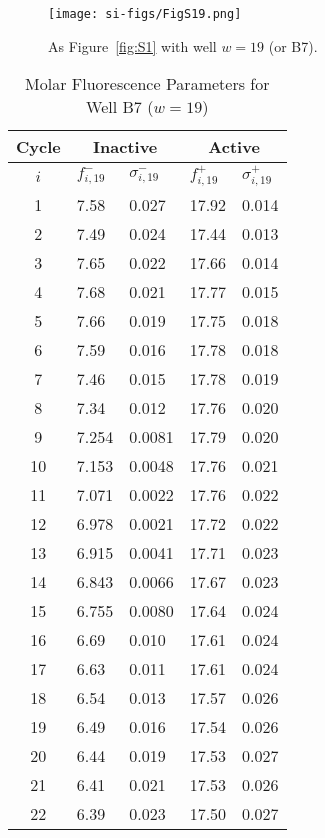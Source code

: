                 \begin{figure}
                    \centering
                    \texttt{[image: si-figs/FigS19.png]}
                    \caption{
                        As Figure~\ref{fig:S1} with well $w=19$ (or B7).
                    }
                \end{figure}
                \clearpage
    \begin{table}
        \caption{Molar Fluorescence Parameters for Well B7 ($w=19$)}
        \centering
        \begin{tabular}{c|ll|ll}
            Cycle & \multicolumn{2}{c|}{Inactive} & \multicolumn{2}{c}{Active} \\
            \hline
            $i$ & $f_{i,19}^{-}$ & $\sigma_{i,19}^{-}$ &  $f_{i,19}^{+}$ & $\sigma_{i,19}^{+}$ \\
            \hline
    1 & 7.58 & 0.027 & 17.92 & 0.014 \\
2 & 7.49 & 0.024 & 17.44 & 0.013 \\
3 & 7.65 & 0.022 & 17.66 & 0.014 \\
4 & 7.68 & 0.021 & 17.77 & 0.015 \\
5 & 7.66 & 0.019 & 17.75 & 0.018 \\
6 & 7.59 & 0.016 & 17.78 & 0.018 \\
7 & 7.46 & 0.015 & 17.78 & 0.019 \\
8 & 7.34 & 0.012 & 17.76 & 0.020 \\
9 & 7.254 & 0.0081 & 17.79 & 0.020 \\
10 & 7.153 & 0.0048 & 17.76 & 0.021 \\
11 & 7.071 & 0.0022 & 17.76 & 0.022 \\
12 & 6.978 & 0.0021 & 17.72 & 0.022 \\
13 & 6.915 & 0.0041 & 17.71 & 0.023 \\
14 & 6.843 & 0.0066 & 17.67 & 0.023 \\
15 & 6.755 & 0.0080 & 17.64 & 0.024 \\
16 & 6.69 & 0.010 & 17.61 & 0.024 \\
17 & 6.63 & 0.011 & 17.61 & 0.024 \\
18 & 6.54 & 0.013 & 17.57 & 0.026 \\
19 & 6.49 & 0.016 & 17.54 & 0.026 \\
20 & 6.44 & 0.019 & 17.53 & 0.027 \\
21 & 6.41 & 0.021 & 17.53 & 0.026 \\
22 & 6.39 & 0.023 & 17.50 & 0.027 \\

\end{tabular}
\end{table}
